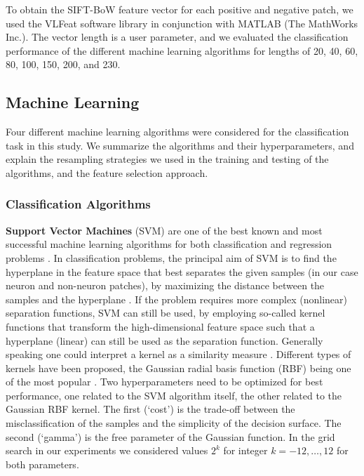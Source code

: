 To obtain the SIFT-BoW feature vector for each positive and negative patch, we used the VLFeat software library \cite{vedaldi2010vlfeat} in conjunction with MATLAB (The MathWorks Inc.). The vector length is a user parameter, and we evaluated the classification performance of the different machine learning algorithms for lengths of 20, 40, 60, 80, 100, 150, 200, and 230.

\subsection{Machine Learning}
\label{subsec:machineLearning}

Four different machine learning algorithms were considered for the classification task in this study. We summarize the algorithms and their hyperparameters, and explain the resampling strategies we used in the training and testing of the algorithms, and the feature selection approach.

\subsubsection{Classification Algorithms}
\label{subsubsec:classifiers}

{\bf Support Vector Machines} (SVM) are one of the best known and most successful machine learning algorithms for both classification and regression problems \cite{boser1992training, vapnik1998statistical, vapnik2013nature, bishop2006pattern}. In classification problems, the principal aim of SVM is to find the hyperplane in the feature space that best separates the given samples (in our case neuron and non-neuron patches), by maximizing the distance between the samples and the hyperplane \cite{burges1998tutorial}. If the problem requires more complex (nonlinear) separation functions, SVM can still be used, by employing so-called kernel functions that transform the high-dimensional feature space such that a hyperplane (linear) can still be used as the separation function. Generally speaking one could interpret a kernel as a similarity measure \cite{2549}. Different types of kernels have been proposed, the Gaussian radial basis function (RBF) being one of the most popular \cite{cristianini2000introduction}. Two hyperparameters need to be optimized for best performance, one related to the SVM algorithm itself, the other related to the Gaussian RBF kernel. The first (`cost') is the trade-off between the misclassification of the samples and the simplicity of the decision surface. The second (`gamma') is the free parameter of the Gaussian function. In the grid search in our experiments we considered values $2^k$ for integer $k=-12,\dots,12$ for both parameters.

